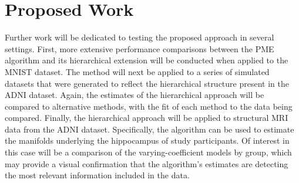 \documentclass[11pt,reqno]{article}
\theoremstyle{definition}
\begin{document}
\section{Proposed Work} \label{s:hpme_adni}
Further work will be dedicated to testing the proposed approach in several settings. First, more extensive performance comparisons between the PME algorithm and its hierarchical extension will be conducted when applied to the MNIST dataset. The method will next be applied to a series of simulated datasets that were generated to reflect the hierarchical structure present in the ADNI dataset. Again, the estimates of the hierarchical approach will be compared to alternative methods, with the fit of each method to the data being compared. Finally, the hierarchical approach will be applied to structural MRI data from the ADNI dataset. Specifically, the algorithm can be used to estimate the manifolds underlying the hippocampus of study participants. Of interest in this case will be a comparison of the varying-coefficient models by group, which may provide a visual confirmation that the algorithm's estimates are detecting the most relevant information included in the data.

\newpage

\nocite{*}
%
%
\printbibliography
\end{document}

